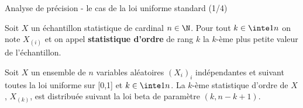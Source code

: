 \documentclass[10pt,serif]{beamer}
\begin{document}
  \begin{frame}{Analyse de précision - le cas de la loi uniforme standard (1/4)}
    \begin{definition}
      Soit \(X\) un échantillon statistique de cardinal \(n \in \N\). Pour tout \(k \in \inte 1 n \) on note \(X_{(i)}\) et on appel \textbf{statistique d'ordre} de rang \(k\) la \(k\)-ème plus petite valeur de l'échantillon.
    \end{definition}

    \begin{theorem}
        \label{staorduni}
        Soit \(X\) un ensemble de \(n\) variables aléatoires \((X_i)_i\) indépendantes et suivant toutes la loi uniforme sur [0,1] et \(k \in \inte 1 n \). La \(k\)-ème statistique d'ordre de \(X\), \(X_{(k)}\), est distribuée suivant la loi beta de paramètre \((k, n-k+1)\).
    \end{theorem}
  \end{frame}
\end{document}
